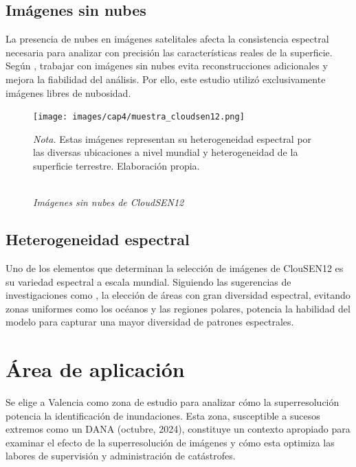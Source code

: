     \subsection{Imágenes sin nubes}

        La presencia de nubes en imágenes satelitales afecta la consistencia espectral necesaria para analizar con precisión las características reales de la superficie.  Según \textcite{li2023transformer}, trabajar con imágenes sin nubes evita reconstrucciones adicionales y mejora la fiabilidad del análisis. Por ello, este estudio utilizó exclusivamente imágenes libres de nubosidad. 
        
        \begin{figure}[H] 
            \caption{\doublespacing \\ \textit{Imágenes sin nubes de CloudSEN12}} 
            \centering
            \texttt{[image: images/cap4/muestra\_cloudsen12.png]}
            \begin{justify}
                \textit{Nota.} Estas imágenes representan su heterogeneidad espectral por las diversas ubicaciones a nivel mundial y heterogeneidad de la superficie terrestre. Elaboración propia.
            \end{justify}                    
            \label{fig:muestra_cloudsen12}
        \end{figure}

    \subsection{Heterogeneidad espectral}

        Uno de los elementos que determinan la selección de imágenes de ClouSEN12 es su variedad espectral a escala mundial. Siguiendo las sugerencias de investigaciones como \textcite{jiao2023integrated}, la elección de áreas con gran diversidad espectral, evitando zonas uniformes como los océanos y las regiones polares, potencia la habilidad del modelo para capturar una mayor diversidad de patrones espectrales.


\section{Área de aplicación}

    Se elige a Valencia como zona de estudio para analizar cómo la superresolución potencia la identificación de inundaciones. Esta zona, susceptible a sucesos extremos como un DANA (octubre, 2024), constituye un contexto apropiado para examinar el efecto de la superresolución de imágenes y cómo esta optimiza las labores de supervisión y administración de catástrofes.
        
